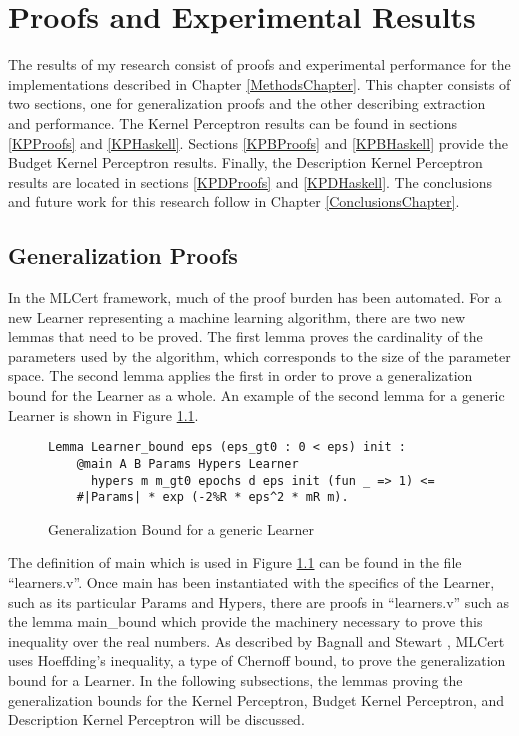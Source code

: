 \chapter{Proofs and Experimental Results}\label{ResultsChapter}
The results of my research consist of proofs and experimental performance for the implementations described in Chapter \ref{MethodsChapter}. This chapter consists of two sections, one for generalization proofs and the other describing extraction and performance. The Kernel Perceptron results can be found in sections \ref{KPProofs} and \ref{KPHaskell}. Sections \ref{KPBProofs} and \ref{KPBHaskell} provide the Budget Kernel Perceptron results. Finally, the Description Kernel Perceptron results are located in sections \ref{KPDProofs} and \ref{KPDHaskell}. The conclusions and future work for this research follow in Chapter \ref{ConclusionsChapter}.
\section{Generalization Proofs}\label{Proofs}
In the MLCert framework, much of the proof burden has been automated. For a new Learner representing a machine learning algorithm, there are two new lemmas that need to be proved. The first lemma proves the cardinality of the parameters used by the algorithm, which corresponds to the size of the parameter space. The second lemma applies the first in order to prove a generalization bound for the Learner as a whole. An example of the second lemma for a generic Learner is shown in Figure \ref{LearnerLemma}.

\begin{figure}
    \caption{Generalization Bound for a generic Learner}
    \label{LearnerLemma}
    \begin{lstlisting}
Lemma Learner_bound eps (eps_gt0 : 0 < eps) init : 
    @main A B Params Hypers Learner
      hypers m m_gt0 epochs d eps init (fun _ => 1) <=
    #|Params| * exp (-2%R * eps^2 * mR m).
    \end{lstlisting}
\end{figure}

The definition of main which is used in Figure \ref{LearnerLemma} can be found in the file ``learners.v''. Once main has been instantiated with the specifics of the Learner, such as its particular Params and Hypers, there are proofs in ``learners.v'' such as the lemma main\_bound which provide the machinery necessary to prove this inequality over the real numbers. As described by Bagnall and Stewart \cite{BS19}, MLCert uses Hoeffding's inequality, a type of Chernoff bound, to prove the generalization bound for a Learner. In the following subsections, the lemmas proving the generalization bounds for the Kernel Perceptron, Budget Kernel Perceptron, and Description Kernel Perceptron will be discussed.
